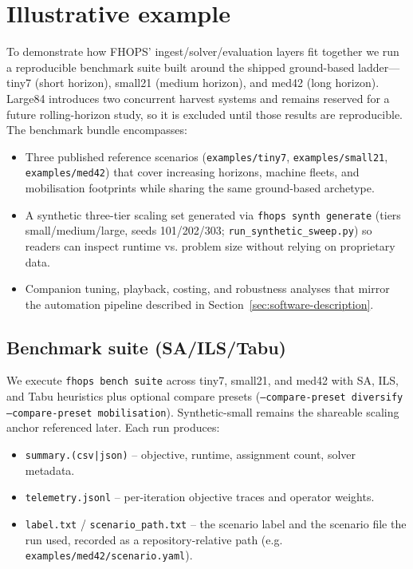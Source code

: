 \section{Illustrative example}
\label{sec:illustrative-example}

To demonstrate how FHOPS’ ingest/solver/evaluation layers fit together we run a reproducible benchmark suite built around the shipped ground-based ladder—tiny7 (short horizon), small21 (medium horizon), and med42 (long horizon). Large84 introduces two concurrent harvest systems and remains reserved for a future rolling-horizon study, so it is excluded until those results are reproducible. The benchmark bundle encompasses:

\begin{itemize}
  \item Three published reference scenarios (\texttt{examples/tiny7}, \texttt{examples/small21}, \texttt{examples/med42}) that cover increasing horizons, machine fleets, and mobilisation footprints while sharing the same ground-based archetype.
  \item A synthetic three-tier scaling set generated via \texttt{fhops synth generate} (tiers small/medium/large, seeds 101/202/303; \texttt{run\_synthetic\_sweep.py}) so readers can inspect runtime vs. problem size without relying on proprietary data.
  \item Companion tuning, playback, costing, and robustness analyses that mirror the automation pipeline described in Section~\ref{sec:software-description}.
\end{itemize}



\subsection{Benchmark suite (SA/ILS/Tabu)}
We execute \texttt{fhops bench suite} across tiny7, small21, and med42 with SA, ILS, and Tabu heuristics plus optional compare presets (\texttt{--compare-preset diversify --compare-preset mobilisation}). Synthetic-small remains the shareable scaling anchor referenced later. Each run produces:
\begin{itemize}
  \item \texttt{summary.(csv|json)} – objective, runtime, assignment count, solver metadata.
  \item \texttt{telemetry.jsonl} – per-iteration objective traces and operator weights.
  \item \texttt{label.txt} / \texttt{scenario\_path.txt} – the scenario label and the scenario file the run used, recorded as a repository-relative path (e.g. \texttt{examples/med42/scenario.yaml}).
\end{itemize}

